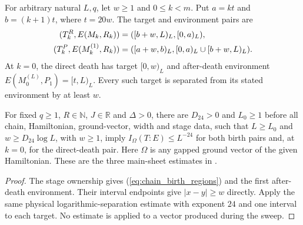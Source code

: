 \begin{lemma}
    \label{thm:chain_stage_physical_information}
    \leanok
    For arbitrary natural $L,q$, let $w\ge1$ and $0\le k<m$.
    Put $a=kt$ and $b=(k+1)t$, where $t=20w$.
    The target and environment pairs are
    \begin{align}
        (T_k^R,E(M_k,R_k))
         & =(\lbrack b+w,L)_L,\lbrack 0,a)_L),\notag               \\
        (T_k^P,E(M_k^{(1)},R_k))
         & =(\lbrack a+w,b)_L,\lbrack 0,a)_L\cup\lbrack b+w,L)_L).
        \label{eq:chain_birth_regions}
    \end{align}
    At $k=0$, the direct death has target $[0,w)_L$ and
    after-death environment $E(M_0^{(L)},P_1)=[t,L)_L$.
    Every such target is separated from its stated environment by at
    least $w$.

    For fixed $q\ge1$, $R\in\mathbb N$, $J\in\mathbb R$ and
    $\Delta>0$, there are $D_{24}>0$ and $L_0\ge1$ before all chain,
    Hamiltonian, ground-vector, width and stage data, such
    that $L\ge L_0$ and $w\ge D_{24}\log L$, with $w\ge1$, imply
    $I_\Omega(T:E)\le L^{-24}$ for both birth pairs and, at $k=0$,
    for the direct-death pair. Here $\Omega$ is any gapped ground
    vector of the given Hamiltonian. These are the three main-sheet
    estimates in \cite[Part~II, proof of
        the sweep proposition]{TNLean2026OneDimensional}.
\end{lemma}
\begin{proof}
    \leanok
    The stage ownership gives (\ref{eq:chain_birth_regions})
    and the first after-death environment. Their interval endpoints
    give $|x-y|\ge w$ directly. Apply the same physical
    logarithmic-separation estimate with exponent $24$ and one
    interval to each target. No estimate is applied to a vector
    produced during the sweep.
\end{proof}

